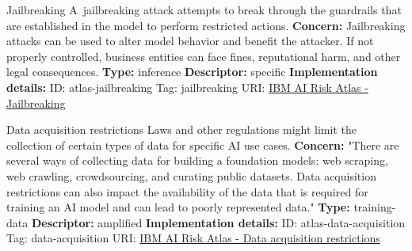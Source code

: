 \documentclass[a4paper,12pt]{article}
\begin{document}
\begin{definitionbox}{Jailbreaking}
A jailbreaking attack attempts to break through the guardrails that are established in the model to perform restricted actions.\newline\newline
\textbf{Concern: }Jailbreaking attacks can be used to alter model behavior and benefit the attacker. If not properly controlled, business entities can face fines, reputational harm, and other legal consequences.\newline\newline
\textbf{Type: }inference\newline
\textbf{Descriptor: }specific \newline\newline
\textbf{Implementation details: } \newline
ID: atlas-jailbreaking \newline
Tag: jailbreaking \newline
URI:  \href{https://www.ibm.com/docs/en/watsonx/saas?topic=SSYOK8/wsj/ai-risk-atlas/jailbreaking.html}{IBM AI Risk Atlas - Jailbreaking}\newline
\end{definitionbox}
\begin{definitionbox}{Data acquisition restrictions}
Laws and other regulations might limit the collection of certain types of data for specific AI use cases.\newline\newline
\textbf{Concern: }"There are several ways of collecting data for building a foundation models: web scraping, web crawling, crowdsourcing, and curating public datasets. Data acquisition restrictions can also impact the availability of the data that is required for training an AI model and can lead to poorly represented data."\newline\newline
\textbf{Type: }training-data\newline
\textbf{Descriptor: }amplified \newline\newline
\textbf{Implementation details: } \newline
ID: atlas-data-acquisition \newline
Tag: data-acquisition \newline
URI:  \href{https://www.ibm.com/docs/en/watsonx/saas?topic=SSYOK8/wsj/ai-risk-atlas/data-acquisition.html}{IBM AI Risk Atlas - Data acquisition restrictions}\newline
\end{definitionbox}
\end{document}
